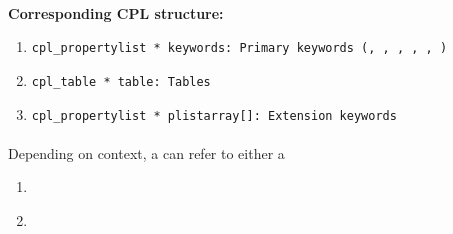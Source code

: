 \paragraph{\hyperref[dataitem:n_distortion_table]{}}\label{drsstructure:N_DISTORTION_TABLE}
\begin{datastructdef}
\textbf{Corresponding \ac{CPL} structure:}
\begin{enumerate}
    \item \texttt{cpl\_propertylist * keywords: Primary keywords (\hyperref[fits:dpr.catg]{},  \hyperref[fits:dpr.tech]{},  \hyperref[fits:dpr.type]{},  \hyperref[fits:ins.opti3.name]{},  \hyperref[fits:ins.opti9.name]{},  \hyperref[fits:ins.opti10.name]{})}
    \item \texttt{cpl\_table * table: Tables}
    \item \texttt{cpl\_propertylist * plistarray[]: Extension keywords}
\end{enumerate}
\end{datastructdef}


\paragraph{\hyperref[dataitem:det_distortion_map]{}}\label{dataitem:det_distortion_map}
Depending on context, a \hyperref[dataitem:det_distortion_map]{} can refer to either a
\begin{enumerate}
\item \hyperref[dataitem:n_distortion_map]{}
\item \hyperref[dataitem:lm_distortion_map]{}
\end{enumerate}


